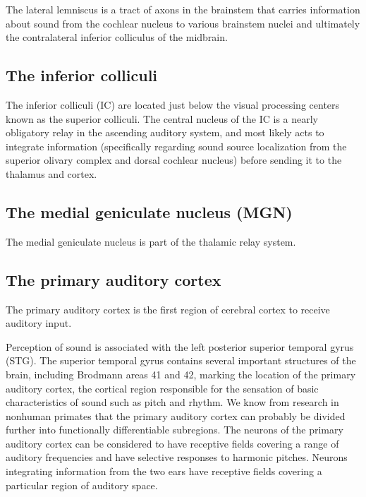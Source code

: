 \documentclass[]{book}
\begin{document}
The lateral lemniscus is a tract of axons in the brainstem that carries information about sound from the cochlear nucleus to various brainstem nuclei and ultimately the contralateral inferior colliculus of the midbrain.

\hypertarget{the-inferior-colliculi}{%
\subsection{The inferior colliculi}\label{the-inferior-colliculi}}

The inferior colliculi (IC) are located just below the visual processing centers known as the superior colliculi. The central nucleus of the IC is a nearly obligatory relay in the ascending auditory system, and most likely acts to integrate information (specifically regarding sound source localization from the superior olivary complex and dorsal cochlear nucleus) before sending it to the thalamus and cortex.

\hypertarget{the-medial-geniculate-nucleus-mgn}{%
\subsection{The medial geniculate nucleus (MGN)}\label{the-medial-geniculate-nucleus-mgn}}

The medial geniculate nucleus is part of the thalamic relay system.

\hypertarget{the-primary-auditory-cortex}{%
\subsection{The primary auditory cortex}\label{the-primary-auditory-cortex}}

The primary auditory cortex is the first region of cerebral cortex to receive auditory input.

Perception of sound is associated with the left posterior superior temporal gyrus (STG). The superior temporal gyrus contains several important structures of the brain, including Brodmann areas 41 and 42, marking the location of the primary auditory cortex, the cortical region responsible for the sensation of basic characteristics of sound such as pitch and rhythm. We know from research in nonhuman primates that the primary auditory cortex can probably be divided further into functionally differentiable subregions. The neurons of the primary auditory cortex can be considered to have receptive fields covering a range of auditory frequencies and have selective responses to harmonic pitches. Neurons integrating information from the two ears have receptive fields covering a particular region of auditory space.
\end{document}
